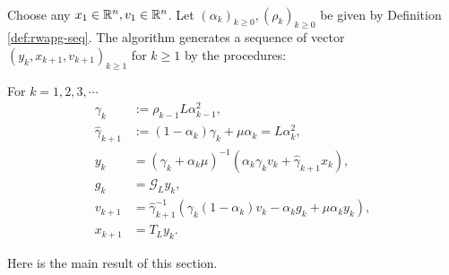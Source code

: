 \documentclass[12pt]{article}
\begin{document}
        \begin{definition}\label{def:wapg}\;\\
            Choose any $x_1 \in \mathbb R^n, v_1 \in \mathbb R^n$. 
            Let $(\alpha_k)_{k \ge0}, (\rho_k)_{k \ge 0}$ be given by Definition \ref{def:rwapg-seq}. 
            The algorithm generates a sequence of vector $(y_k, x_{k + 1}, v_{k + 1})_{k \ge 1}$ for $k\ge 1$ by the procedures:  
            \begin{tcolorbox}
                For $k=1, 2, 3, \cdots$
                \begin{align*}
                    \gamma_k &:= \rho_{k -1}L\alpha_{k - 1}^2, 
                    \\
                    \hat \gamma_{k + 1} & := (1 - \alpha_k)\gamma_k + \mu \alpha_k = L\alpha_k^2, 
                    \\
                    y_k &= 
                    (\gamma_k + \alpha_k \mu)^{-1}(\alpha_k \gamma_k v_k + \hat\gamma_{k + 1} x_k), 
                    \\
                    g_k &= \mathcal G_L y_k, 
                    \\
                    v_{k + 1} &= 
                    \hat\gamma^{-1}_{k + 1}
                    (\gamma_k(1 - \alpha_k) v_k - \alpha_k g_k + \mu \alpha_k y_k), 
                    \\
                    x_{k + 1} &= T_L y_k. 
                \end{align*}    
            \end{tcolorbox}
        \end{definition}
        Here is the main result of this section. 
\end{document}
